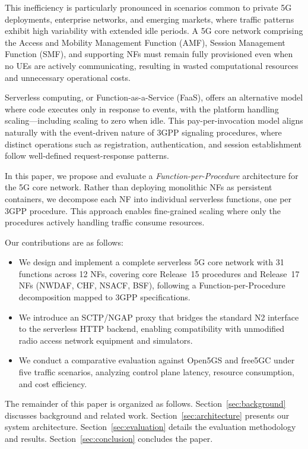\documentclass[conference]{IEEEtran}
\begin{document}
This inefficiency is particularly pronounced in scenarios common to private 5G deployments, enterprise networks, and emerging markets, where traffic patterns exhibit high variability with extended idle periods. A 5G core network comprising the Access and Mobility Management Function (AMF), Session Management Function (SMF), and supporting NFs must remain fully provisioned even when no UEs are actively communicating, resulting in wasted computational resources and unnecessary operational costs.

Serverless computing, or Function-as-a-Service (FaaS), offers an alternative model where code executes only in response to events, with the platform handling scaling---including scaling to zero when idle. This pay-per-invocation model aligns naturally with the event-driven nature of 3GPP signaling procedures, where distinct operations such as registration, authentication, and session establishment follow well-defined request-response patterns.

In this paper, we propose and evaluate a \textit{Function-per-Procedure} architecture for the 5G core network. Rather than deploying monolithic NFs as persistent containers, we decompose each NF into individual serverless functions, one per 3GPP procedure. This approach enables fine-grained scaling where only the procedures actively handling traffic consume resources.

Our contributions are as follows:
\begin{itemize}
    \item We design and implement a complete serverless 5G core network with 31 functions across 12 NFs, covering core Release~15 procedures and Release~17 NFs (NWDAF, CHF, NSACF, BSF), following a Function-per-Procedure decomposition mapped to 3GPP specifications.
    \item We introduce an SCTP/NGAP proxy that bridges the standard N2 interface to the serverless HTTP backend, enabling compatibility with unmodified radio access network equipment and simulators.
    \item We conduct a comparative evaluation against Open5GS and free5GC under five traffic scenarios, analyzing control plane latency, resource consumption, and cost efficiency.
\end{itemize}

The remainder of this paper is organized as follows. Section~\ref{sec:background} discusses background and related work. Section~\ref{sec:architecture} presents our system architecture. Section~\ref{sec:evaluation} details the evaluation methodology and results. Section~\ref{sec:conclusion} concludes the paper.
\end{document}
